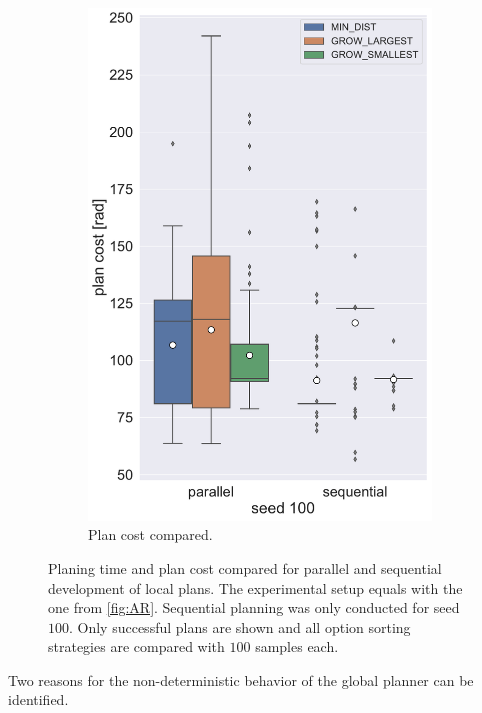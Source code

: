 \begin{figure}
\begin{subfigure}[h]{0.5\textwidth}
		\includegraphics[width=\textwidth]{figures/plots/AR_parseq_cost.pdf}
		\caption{Plan cost compared.}
		\label{fig:AR_parseq_cost}
	\end{subfigure}
	\caption[Planning time and plan cost for parallel and sequential planning]{Planing time and plan cost compared for parallel and sequential development of local plans. The experimental setup equals with the one from \autoref{fig:AR}. Sequential planning was only conducted for seed $100$. Only successful plans are shown and all option sorting strategies are compared with $100$ samples each.}
	\label{fig:AR_parseq}
\end{figure}

Two reasons for the non-deterministic behavior of the global planner can be identified.

